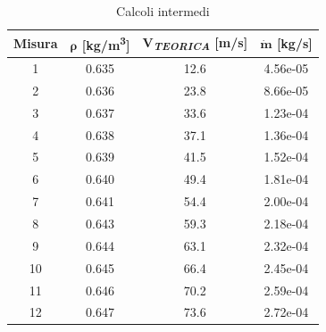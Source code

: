 \begin{table}[H]
	\centering
	\begin{tabular}{c|c|c|c}
		\toprule
		\toprule
		\textbf{Misura} & \textbf{$\bm{\rho}$ [kg/m\textsuperscript{3}]} & \textbf{V\textsubscript{\textit{TEORICA}} [m/s]} 
		& \textbf{$\bm{\dot{m}}$ [kg/s]}  \\
		\midrule
		\midrule
		1 & 0.635 & 12.6 & 4.56e-05 \\
		\midrule
		2 & 0.636 & 23.8 & 8.66e-05 \\
		\midrule
		3 & 0.637 & 33.6 & 1.23e-04 \\
		\midrule
		4 & 0.638 & 37.1 & 1.36e-04 \\
		\midrule
		5 & 0.639 & 41.5 & 1.52e-04 \\
		\midrule
		6 & 0.640 & 49.4 & 1.81e-04 \\
		\midrule
		7 & 0.641 & 54.4 & 2.00e-04 \\
		\midrule
		8 & 0.643 & 59.3 & 2.18e-04 \\
		\midrule
		9 & 0.644 & 63.1 & 2.32e-04 \\
		\midrule
		10 & 0.645 & 66.4 & 2.45e-04 \\
		\midrule
		11 & 0.646 & 70.2 & 2.59e-04 \\
		\midrule
		12 & 0.647 & 73.6 & 2.72e-04 \\
		\bottomrule
		\bottomrule
	\end{tabular}
	\caption{Calcoli intermedi}
	\label{tab:calcoli_intermedi}
\end{table}

